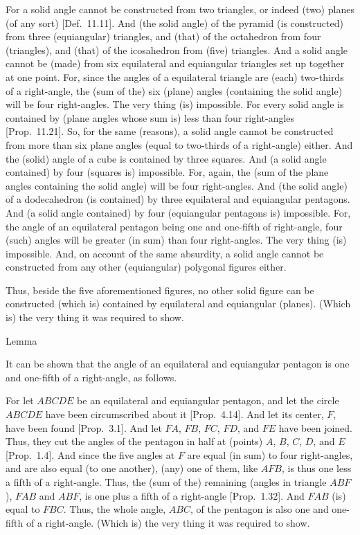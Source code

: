 For a solid angle cannot be constructed from two triangles, or indeed (two) planes (of any sort) [Def.~11.11]. And (the solid angle) of the
pyramid (is constructed) from three (equiangular) triangles, and (that) of the octahedron
from four (triangles), and (that) of the icosahedron from (five) triangles. 
And a solid angle cannot be (made) from six equilateral and
equiangular triangles set up together at one point. For, since the angles of a
equilateral triangle are (each)  two-thirds of a right-angle, the (sum of the)
six  (plane) angles (containing the solid angle) will be four right-angles. The very thing (is) impossible.
For every solid angle is contained by (plane angles whose sum is) less than four right-angles [Prop.~11.21].  So, for the same (reasons), a solid angle cannot be constructed from more than six  plane angles (equal to two-thirds of a right-angle) either. And the (solid) angle of a cube
is contained by three squares. And (a solid angle contained) by four
(squares is) impossible. For, again, the (sum of the plane angles
containing the solid angle) will be four right-angles. And (the solid angle)
of a dodecahedron (is contained) by three equilateral and equiangular
pentagons. And (a solid angle contained) by four (equiangular
pentagons is) impossible. For, the angle of an equilateral
pentagon being one and one-fifth of right-angle, four (such) angles will be
greater (in sum) than four right-angles. The very thing (is) impossible. And, on account of the same absurdity, a solid angle cannot be constructed from any other
(equiangular) polygonal figures either.

Thus, beside the five aforementioned figures, no other solid figure can be constructed (which is) contained by equilateral and equiangular (planes).
(Which is) the very thing it was required to show.



\epsfysize=2in
\centerline{}

\begin{center}\vspace*{-7pt}
{\large Lemma}
\end{center}\vspace*{-7pt}

It can be shown that the angle of an equilateral and
equiangular pentagon is one and one-fifth of a right-angle,
as follows.

For let $ABCDE$ be an equilateral and equiangular pentagon, and
let the circle $ABCDE$ have been circumscribed about it [Prop.~4.14]. 
And let its center, $F$, have been found [Prop.~3.1]. 
And let $FA$, $FB$, $FC$, $FD$, and $FE$ have been joined. Thus,
they cut the angles of the pentagon in half at (points)
 $A$, $B$, $C$, $D$, and $E$  [Prop.~1.4].
 And since the five
angles at $F$ are equal (in sum) to four right-angles, and
are also equal (to one another),  (any) one of them, like $AFB$, is thus
one less a fifth of a right-angle. Thus, the (sum of the) remaining
(angles in triangle $ABF$), $FAB$ and $ABF$,  is one plus a fifth  of a right-angle
[Prop.~1.32]. And $FAB$ (is) equal to $FBC$. Thus, the
whole angle, $ABC$, of the pentagon is also one and one-fifth
of a right-angle. (Which is) the very thing it was required to show.

